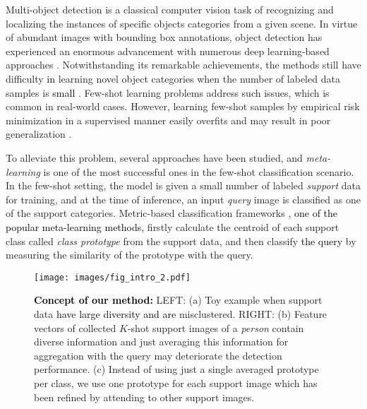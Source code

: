 \documentclass[10pt,twocolumn,letterpaper]{article}
\newcommand{\nj}[1]{\textcolor{black}{#1}}
\begin{document}
Multi-object detection is a classical computer vision task of recognizing and localizing the instances of specific objects categories from a given scene. 
In virtue of abundant images with bounding box annotations, object detection has experienced an enormous advancement with numerous deep learning-based approaches \cite{ren2015faster, liu2016ssd, redmon2016you}.
Notwithstanding its remarkable achievements, the methods still have difficulty \nj{in} learning novel object categories when the number of labeled data samples is \nj{small} \cite{sohn2020simple, li2020overcoming}. 
Few-shot learning problems address such issues, which is common in real-world cases. 
However, learning few-shot samples by empirical risk minimization in a supervised manner easily overfits and may result in poor generalization \cite{bousquet2003introduction, wang2020generalizing}.

To alleviate this problem, several approaches have been studied, and \textit{meta-learning} is one of the most successful ones in the few-shot classification scenario. In the few-shot setting, the model is given a small number of labeled \emph{support} data for training, and at the time of inference, an input \emph{query} image is classified as one of the support categories. Metric-based classification frameworks \cite{vinyals2016matching, yang2021free, snell2017prototypical, li2019few, sung2018learning}, \nj{one of the popular meta-learning methods,} firstly calculate the centroid of each support class called \emph{class prototype} from the support data, and then classify \nj{the query} by measuring the similarity of the prototype with the query.
\begin{figure*}
\begin{center}
\texttt{[image: images/fig\_intro\_2.pdf]}
\vspace{-0.70cm}
\end{center}
  \caption{\textbf{\nj{Concept of our method:}} LEFT: (a) Toy example when support data \nj{have large diversity and are} misclustered. RIGHT: (b) Feature vectors of collected $K$-shot support images of a \textit{person} contain diverse information and just averaging this information for aggregation with the query may deteriorate the detection performance. (c) Instead of using just a single averaged prototype per class, we use one prototype for each support image which has been refined by attending to other support images.}  \vspace{-0.20cm}
\label{fig:intro}
\end{figure*}
\end{document}
